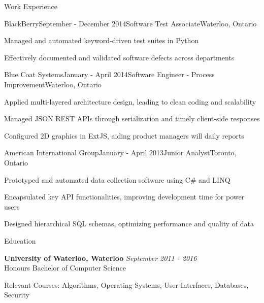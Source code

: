 \documentclass{resume} %
\begin{document}
\begin{rSection}{Work Experience}
\smallskip
\begin{rSubsection}{BlackBerry}{September - December 2014}{Software Test Associate}{Waterloo, Ontario}
\item Managed and automated keyword-driven test suites in Python
\item Effectively documented and validated software defects across departments
\end{rSubsection}

\begin{rSubsection}{Blue Coat Systems}{January - April 2014}{Software Engineer - Process Improvement}{Waterloo, Ontario}
\item Applied multi-layered architecture design, leading to clean coding and scalability
\item Managed JSON REST APIs through serialization and timely client-side responses
\item Configured 2D graphics in ExtJS, aiding product managers will daily reports
\end{rSubsection}

\begin{rSubsection}{American International Group}{January - April 2013}{Junior Analyst}{Toronto, Ontario}
\item Prototyped and automated data collection software using C\# and LINQ
\item Encapsulated key API functionalities, improving development time for power users
\item Designed hierarchical SQL schemas, optimizing performance and quality of data
\end{rSubsection}

\end{rSection}


\begin{rSection}{Education}

{\bf University of Waterloo, Waterloo} \hfill {\em September 2011 - 2016} \\ 
Honours Bachelor of Computer Science 

\begin{rSubsection}{Relevant Courses:} {}{}{}
Algorithms, Operating Systems, User Interfaces, Databases, Security

\end{rSubsection}

\end{rSection}
\end{document}
